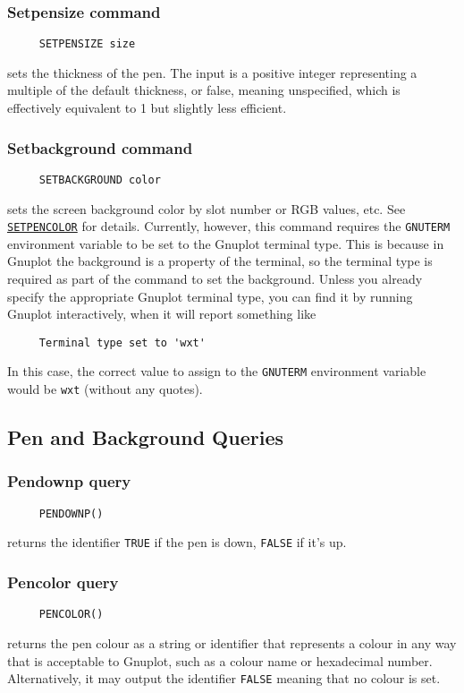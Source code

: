\subsubsection*{Setpensize command}
\begin{verbatim}
     SETPENSIZE size
\end{verbatim}
sets the thickness of the pen.  The input is a positive integer
representing a multiple of the default thickness, or false, meaning
unspecified, which is effectively equivalent to 1 but slightly less
efficient.

\subsubsection*{Setbackground command}
\begin{verbatim}
     SETBACKGROUND color
\end{verbatim}
sets the screen background color by slot number or RGB values, etc.
See \hyperref[logoturtle:setpencolor]{\texttt{SETPENCOLOR}} for
details.  Currently, however, this command requires the
\texttt{GNUTERM} environment variable to be set to the Gnuplot
terminal type.  This is because in Gnuplot the background is a
property of the terminal, so the terminal type is required as part of
the command to set the background.  Unless you already specify the
appropriate Gnuplot terminal type, you can find it by running Gnuplot
interactively, when it will report something like
\begin{verbatim}
     Terminal type set to 'wxt'
\end{verbatim}
In this case, the correct value to assign to the \texttt{GNUTERM}
environment variable would be \texttt{wxt} (without any quotes).


\subsection{Pen and Background Queries}

\subsubsection*{Pendownp query}
\begin{verbatim}
     PENDOWNP()
\end{verbatim}
returns the identifier \texttt{TRUE} if the pen is down,
\texttt{FALSE} if it's up.

\subsubsection*{Pencolor query}
\begin{verbatim}
     PENCOLOR()
\end{verbatim}
\label{logoturtle:pencolor}
returns the pen colour as a string or identifier that represents a
colour in any way that is acceptable to Gnuplot, such as a colour name
or hexadecimal number.  Alternatively, it may output the identifier
\texttt{FALSE} meaning that no colour is set.


